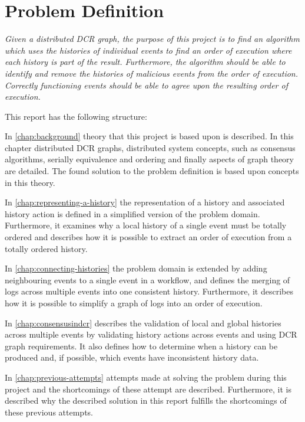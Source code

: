 \section{Problem Definition} %
	\textit{Given a distributed DCR graph, the purpose of this project is to find an algorithm which uses the histories of individual events to find an order of execution where each history is part of the result. Furthermore, the algorithm should be able to identify and remove the histories of malicious events from the order of execution. Correctly functioning events should be able to agree upon the resulting order of execution.}
	
	\vspace{0.4cm}
	
	\newpar
	This report has the following structure:
	
	\newpar
	In \autoref{chap:background} theory that this project is based upon is described. In this chapter distributed DCR graphs, distributed system concepts, such as consensus algorithms, serially equivalence and ordering and finally aspects of graph theory are detailed.
	The found solution to the problem definition is based upon concepts in this theory.
		
	\newpar
	In \autoref{chap:representing-a-history} the representation of a history and associated history action is defined in a simplified version of the problem domain. 
	Furthermore, it examines why a local history of a single event must be totally ordered and describes how it is possible to extract an order of execution from a totally ordered history.
		
	\newpar
	In \autoref{chap:connecting-histories} the problem domain is extended by adding neighbouring events to a single event in a workflow, and defines the merging of logs across multiple events into one consistent history. Furthermore, it describes how it is possible to simplify a graph of logs into an order of execution.
	
	\newpar
	In \autoref{chap:consensusindcr} describes the validation of local and global histories across multiple events by validating history actions across events and using DCR graph requirements. It also defines how to determine when a history can be produced and, if possible, which events have inconsistent history data.
	
	\newpar
	In \autoref{chap:previous-attempts} attempts made at solving the problem during this project and the shortcomings of these attempt are described. Furthermore, it is described why the described solution in this report fulfills the shortcomings of these previous attempts. 
		
	